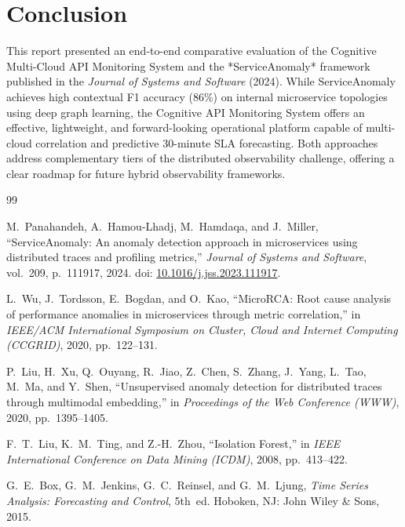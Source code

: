 \documentclass[11pt,a4paper]{article}
\begin{document}
\section{Conclusion}
This report presented an end-to-end comparative evaluation of the Cognitive Multi-Cloud API Monitoring System and the *ServiceAnomaly* framework published in the \textit{Journal of Systems and Software} (2024). While ServiceAnomaly achieves high contextual F1 accuracy (86\%) on internal microservice topologies using deep graph learning, the Cognitive API Monitoring System offers an effective, lightweight, and forward-looking operational platform capable of multi-cloud correlation and predictive 30-minute SLA forecasting. Both approaches address complementary tiers of the distributed observability challenge, offering a clear roadmap for future hybrid observability frameworks.

\begin{thebibliography}{99}

M.~Panahandeh, A.~Hamou-Lhadj, M.~Hamdaqa, and J.~Miller,
``ServiceAnomaly: An anomaly detection approach in microservices using distributed traces and profiling metrics,''
\textit{Journal of Systems and Software}, vol.~209, p.~111917, 2024.
doi: \href{https://doi.org/10.1016/j.jss.2023.111917}{10.1016/j.jss.2023.111917}.

L.~Wu, J.~Tordsson, E.~Bogdan, and O.~Kao,
``MicroRCA: Root cause analysis of performance anomalies in microservices through metric correlation,''
in \textit{IEEE/ACM International Symposium on Cluster, Cloud and Internet Computing (CCGRID)}, 2020, pp.~122--131.

P.~Liu, H.~Xu, Q.~Ouyang, R.~Jiao, Z.~Chen, S.~Zhang, J.~Yang, L.~Tao, M.~Ma, and Y.~Shen,
``Unsupervised anomaly detection for distributed traces through multimodal embedding,''
in \textit{Proceedings of the Web Conference (WWW)}, 2020, pp.~1395--1405.

F.~T.~Liu, K.~M.~Ting, and Z.-H.~Zhou,
``Isolation Forest,''
in \textit{IEEE International Conference on Data Mining (ICDM)}, 2008, pp.~413--422.

G.~E.~Box, G.~M.~Jenkins, G.~C.~Reinsel, and G.~M.~Ljung,
\textit{Time Series Analysis: Forecasting and Control}, 5th~ed.
Hoboken, NJ: John Wiley \& Sons, 2015.

\end{thebibliography}
\end{document}
